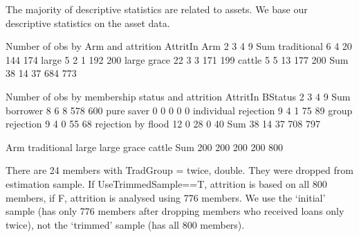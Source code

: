 
The majority of descriptive statistics are related to assets. We base our descriptive statistics on the asset data.

\begin{Schunk}
\begin{Soutput}


Number of obs by Arm and attrition
             AttritIn
Arm             2   3   4   9 Sum
  traditional   6   4  20 144 174
  large         5   2   1 192 200
  large grace  22   3   3 171 199
  cattle        5   5  13 177 200
  Sum          38  14  37 684 773


Number of obs by membership status and attrition
                      AttritIn
BStatus                  2   3   4   9 Sum
  borrower               8   6   8 578 600
  pure saver             0   0   0   0   0
  individual rejection   9   4   1  75  89
  group rejection        9   4   0  55  68
  rejection by flood    12   0  28   0  40
  Sum                   38  14  37 708 797
\end{Soutput}
\end{Schunk}
\begin{Schunk}
\begin{Soutput}
Arm
traditional       large large grace      cattle         Sum 
        200         200         200         200         800 
\end{Soutput}
\end{Schunk}
There are 24 members with TradGroup = twice, double. They were dropped from estimation sample. If \textsf{UseTrimmedSample==T}, attrition is based on all 800 members, if \textsf{F}, attrition is analysed using 776 members. We use the `initial' sample (has only 776 members after dropping members who received loans only twice), not the `trimmed' sample (has all 800 members). \gobblepars


